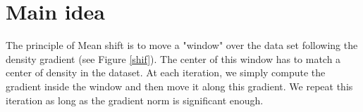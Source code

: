 \section{Main idea}
The principle of Mean shift is to move a "window" over the data set following the density gradient (see Figure \ref{shif}). The center of this window has to match a center of density in the dataset. At each iteration, we simply compute the gradient inside the window and then move it along this gradient. We repeat this iteration as long as the gradient norm is significant enough.\\
\begin{figure}[h!]
\end{figure}
